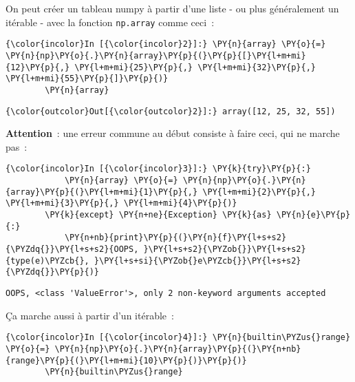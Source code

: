     On peut créer un tableau numpy à partir d'une liste - ou plus
généralement un itérable - avec la fonction \texttt{np.array} comme
ceci~:

    \begin{Verbatim}[commandchars=\\\{\},frame=single,framerule=0.3mm,rulecolor=\color{cellframecolor}]
{\color{incolor}In [{\color{incolor}2}]:} \PY{n}{array} \PY{o}{=} \PY{n}{np}\PY{o}{.}\PY{n}{array}\PY{p}{(}\PY{p}{[}\PY{l+m+mi}{12}\PY{p}{,} \PY{l+m+mi}{25}\PY{p}{,} \PY{l+m+mi}{32}\PY{p}{,} \PY{l+m+mi}{55}\PY{p}{]}\PY{p}{)}
        \PY{n}{array}
\end{Verbatim}


\begin{Verbatim}[commandchars=\\\{\},frame=single,framerule=0.3mm,rulecolor=\color{cellframecolor}]
{\color{outcolor}Out[{\color{outcolor}2}]:} array([12, 25, 32, 55])
\end{Verbatim}
            
    \textbf{Attention}~: une erreur commune au début consiste à faire ceci,
qui ne marche pas~:

    \begin{Verbatim}[commandchars=\\\{\},frame=single,framerule=0.3mm,rulecolor=\color{cellframecolor}]
{\color{incolor}In [{\color{incolor}3}]:} \PY{k}{try}\PY{p}{:}
            \PY{n}{array} \PY{o}{=} \PY{n}{np}\PY{o}{.}\PY{n}{array}\PY{p}{(}\PY{l+m+mi}{1}\PY{p}{,} \PY{l+m+mi}{2}\PY{p}{,} \PY{l+m+mi}{3}\PY{p}{,} \PY{l+m+mi}{4}\PY{p}{)}
        \PY{k}{except} \PY{n+ne}{Exception} \PY{k}{as} \PY{n}{e}\PY{p}{:}
            \PY{n+nb}{print}\PY{p}{(}\PY{n}{f}\PY{l+s+s2}{\PYZdq{}}\PY{l+s+s2}{OOPS, }\PY{l+s+s2}{\PYZob{}}\PY{l+s+s2}{type(e)\PYZcb{}, }\PY{l+s+si}{\PYZob{}e\PYZcb{}}\PY{l+s+s2}{\PYZdq{}}\PY{p}{)}
\end{Verbatim}


    \begin{Verbatim}[commandchars=\\\{\},frame=single,framerule=0.3mm,rulecolor=\color{cellframecolor}]
OOPS, <class 'ValueError'>, only 2 non-keyword arguments accepted
\end{Verbatim}

    Ça marche aussi à partir d'un itérable~:

    \begin{Verbatim}[commandchars=\\\{\},frame=single,framerule=0.3mm,rulecolor=\color{cellframecolor}]
{\color{incolor}In [{\color{incolor}4}]:} \PY{n}{builtin\PYZus{}range} \PY{o}{=} \PY{n}{np}\PY{o}{.}\PY{n}{array}\PY{p}{(}\PY{n+nb}{range}\PY{p}{(}\PY{l+m+mi}{10}\PY{p}{)}\PY{p}{)}
        \PY{n}{builtin\PYZus{}range}
\end{Verbatim}


